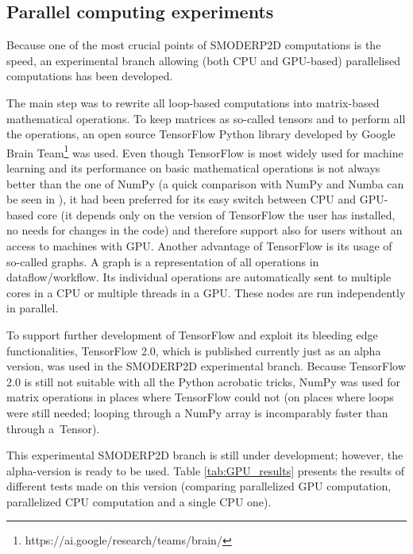 \subsection{Parallel computing experiments}

Because one of the most crucial points of SMODERP2D computations is
the speed, an experimental branch allowing (both CPU and GPU-based)
parallelised computations has been developed.

The main step was to rewrite all loop-based computations into
matrix-based mathematical operations. To keep matrices as so-called
tensors and to perform all the operations, an open source  TensorFlow Python
library \cite{tensorflow2015-whitepaper} developed by Google Brain
Team\footnote{https://ai.google/research/teams/brain/} was used. Even though
TensorFlow is most widely used for machine learning
and its performance on basic mathematical operations is not always better
than the one of NumPy (a quick comparison with NumPy and Numba can be
seen in \cite{tf-np}), it had been preferred for its easy switch
between CPU and GPU-based core (it depends only on the version of
TensorFlow the user has installed, no needs for changes in the code) and
therefore support also for users without an access to machines with
GPU. Another advantage of TensorFlow is its usage of so-called
graphs. A graph is a representation of all operations in
dataflow/workflow. Its individual operations are automatically sent
to multiple cores in a CPU or multiple threads in a GPU. These nodes
are run independently in parallel.

To support further development of TensorFlow and exploit its bleeding
edge functionalities, TensorFlow 2.0, which is published currently
just as an alpha version, was used in the SMODERP2D experimental
branch. Because TensorFlow 2.0 is still not suitable with all the
Python acrobatic tricks, NumPy was used for matrix operations in
places where TensorFlow could not (on places where loops were still
needed; looping through a NumPy array is incomparably faster than
through a~Tensor).

This experimental SMODERP2D branch is still under development;
however, the alpha-version is ready to be used. Table \ref{tab:GPU_results}
presents the results of different tests made on this version
(comparing parallelized GPU computation, parallelized CPU computation and a single CPU one).

